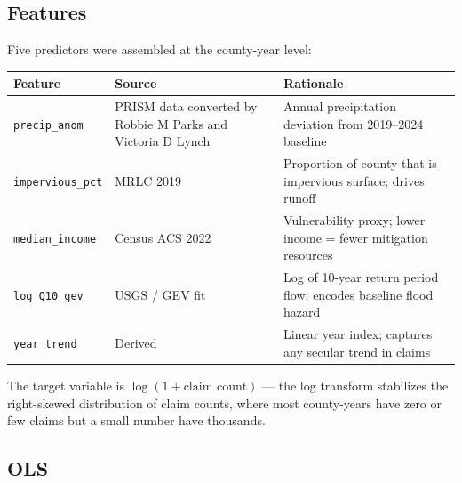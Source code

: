 \documentclass[
  letterpaper,
  DIV=11,
  numbers=noendperiod]{scrartcl}
\newcounter{none} %
\begin{document}
\subsection{Features}\label{features}

Five predictors were assembled at the county-year level:

{\def\LTcaptype{none} %
\begin{longtable}[]{@{}
  >{\raggedright\arraybackslash}p{}
  >{\raggedright\arraybackslash}p{}
  >{\raggedright\arraybackslash}p{}@{}}
\toprule\noalign{}
\begin{minipage}[b]{\linewidth}\raggedright
Feature
\end{minipage} & \begin{minipage}[b]{\linewidth}\raggedright
Source
\end{minipage} & \begin{minipage}[b]{\linewidth}\raggedright
Rationale
\end{minipage} \\
\midrule\noalign{}
\endhead
\bottomrule\noalign{}
\endlastfoot
\texttt{precip\_anom} & PRISM data converted by Robbie M Parks and
Victoria D Lynch & Annual precipitation deviation from 2019--2024
baseline \\
\texttt{impervious\_pct} & MRLC 2019 & Proportion of county that is
impervious surface; drives runoff \\
\texttt{median\_income} & Census ACS 2022 & Vulnerability proxy; lower
income = fewer mitigation resources \\
\texttt{log\_Q10\_gev} & USGS / GEV fit & Log of 10-year return period
flow; encodes baseline flood hazard \\
\texttt{year\_trend} & Derived & Linear year index; captures any secular
trend in claims \\
\end{longtable}
}

The target variable is \(\log(1 + \text{claim count})\) --- the log
transform stabilizes the right-skewed distribution of claim counts,
where most county-years have zero or few claims but a small number have
thousands.

\subsection{OLS}\label{ols}
\end{document}
